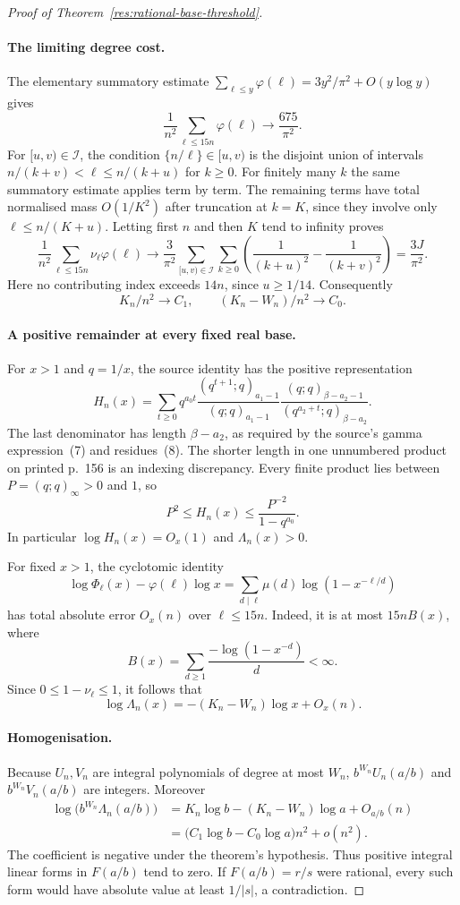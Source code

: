 \documentclass[11pt]{article}
\begin{document}
\begin{proof}[Proof of Theorem~\ref{res:rational-base-threshold}]
\paragraph{The limiting degree cost.}
The elementary summatory estimate
$\sum_{\ell\le y}\varphi(\ell)=3y^2/\pi^2+O(y\log y)$ gives
\[
 \frac1{n^2}\sum_{\ell\le15n}\varphi(\ell)\longrightarrow\frac{675}{\pi^2}.
\]
For $[u,v)\in\mathcal I$, the condition $\{n/\ell\}\in[u,v)$ is the
disjoint union of intervals
$n/(k+v)<\ell\le n/(k+u)$ for $k\ge0$.
For finitely many $k$ the same summatory estimate applies term by term.
The remaining terms have total normalised mass $O(1/K^2)$ after truncation
at $k=K$, since they involve only $\ell\le n/(K+u)$.
Letting first $n$ and then $K$ tend to infinity proves
\[
 \frac1{n^2}\sum_{\ell\le15n}\nu_\ell\varphi(\ell)
 \longrightarrow\frac3{\pi^2}
 \sum_{[u,v)\in\mathcal I}\sum_{k\ge0}
 \left(\frac1{(k+u)^2}-\frac1{(k+v)^2}\right)=\frac{3J}{\pi^2}.
\]
Here no contributing index exceeds $14n$, since $u\ge1/14$.
Consequently
\[
 K_n/n^2\longrightarrow C_1,\qquad
 (K_n-W_n)/n^2\longrightarrow C_0.
\]

\paragraph{A positive remainder at every fixed real base.}
For $x>1$ and $q=1/x$, the source identity has the positive representation
\[
 H_n(x)=\sum_{t\ge0}q^{a_0t}
 \frac{(q^{t+1};q)_{a_1-1}}{(q;q)_{a_1-1}}
 \frac{(q;q)_{\beta-a_2-1}}{(q^{a_2+t};q)_{\beta-a_2}}.
\]
The last denominator has length $\beta-a_2$, as required by the source's
gamma expression~(7) and residues~(8).  The shorter length in one unnumbered
product on printed p.~156 is an indexing discrepancy.
Every finite product lies between $P=(q;q)_\infty>0$ and $1$, so
\[
 P^2\le H_n(x)\le\frac{P^{-2}}{1-q^{a_0}}.
\]
In particular $\log H_n(x)=O_x(1)$ and $\Lambda_n(x)>0$.

For fixed $x>1$, the cyclotomic identity
\[
 \log\Phi_\ell(x)-\varphi(\ell)\log x
 =\sum_{d\mid\ell}\mu(d)\log(1-x^{-\ell/d})
\]
has total absolute error $O_x(n)$ over $\ell\le15n$.
Indeed, it is at most $15n B(x)$, where
\[
 B(x)=\sum_{d\ge1}\frac{-\log(1-x^{-d})}{d}<\infty.
\]
Since $0\le1-\nu_\ell\le1$, it follows that
\[
 \log\Lambda_n(x)=-(K_n-W_n)\log x+O_x(n).
\]

\paragraph{Homogenisation.}
Because $U_n,V_n$ are integral polynomials of degree at most $W_n$,
$b^{W_n}U_n(a/b)$ and $b^{W_n}V_n(a/b)$ are integers.
Moreover
\[
\begin{split}
 \log\bigl(b^{W_n}\Lambda_n(a/b)\bigr)
 &=K_n\log b-(K_n-W_n)\log a+O_{a/b}(n)\\
 &=\bigl(C_1\log b-C_0\log a\bigr)n^2+o(n^2).
\end{split}
\]
The coefficient is negative under the theorem's hypothesis.  Thus positive
integral linear forms in $F(a/b)$ tend to zero.  If $F(a/b)=r/s$ were rational,
every such form would have absolute value at least $1/|s|$, a contradiction.
\end{proof}
\end{document}
